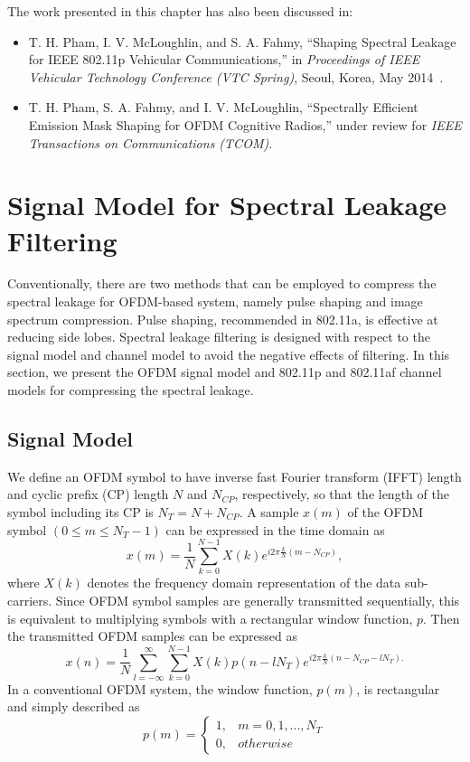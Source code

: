 The work presented in this chapter has also been discussed in:
\begin{itemize}
\item  T. H. Pham, I. V. McLoughlin, and S. A. Fahmy, ``Shaping Spectral Leakage for IEEE 802.11p Vehicular Communications,'' in \textit{Proceedings of IEEE Vehicular Technology Conference (VTC Spring)}, Seoul, Korea, May 2014~\cite{PhamMay2014}.
\item T. H. Pham, S. A. Fahmy, and I. V. McLoughlin, ``Spectrally Efficient Emission Mask Shaping for OFDM Cognitive Radios,''  under review for \textit{IEEE Transactions on Communications (TCOM)}.
\end{itemize}

\section{Signal Model for Spectral Leakage Filtering}
\label{sec:SigMod}
Conventionally, there are two methods that can be employed to compress the spectral leakage for OFDM-based system, namely pulse shaping and image spectrum compression. Pulse shaping, recommended in 802.11a, is effective at reducing side lobes. Spectral leakage filtering is designed with respect to the signal model and channel model to avoid the negative effects of filtering. In this section, we present the OFDM signal model and 802.11p and 802.11af channel models for compressing the spectral leakage.

\subsection{Signal Model}
We define an OFDM symbol to have inverse fast Fourier transform (IFFT) length and cyclic prefix (CP) length $N$ and $N_{CP}$, respectively, so that the length of the symbol including its CP is $N_{T} = N + N_{CP}$.
A sample $x(m)$ of the OFDM symbol $(0\leq m \leq N_{T}-1)$ can be expressed in the time domain as
\begin{equation}
\label{xm}
x(m) = \frac{1}{N}\sum_{k=0}^{N-1} X(k) e^{i2\pi\frac{k}{N}(m-N_{CP})},
\end{equation}
where $X(k)$ denotes the frequency domain representation of the data sub-carriers.
Since OFDM symbol samples are generally transmitted sequentially, this is equivalent to multiplying symbols with a rectangular window function, $p$.
Then the transmitted OFDM samples can be expressed as
\begin{equation}
\label{xn2}
x(n) = \frac{1}{N}\sum_{l=-\infty}^{\infty} \sum_{k=0}^{N-1} X(k) p(n-l N_{T}) e^{i2\pi\frac{k}{N}(n-N_{CP}-l N_{T}).}
\end{equation}
In a conventional OFDM system, the window function, $p(m)$, is rectangular and simply described as
\begin{equation}
\label{pm}
 p(m) =\begin{cases}1, & m = 0,1, ..., N_{T} \\  0, & otherwise \end{cases}
\end{equation}

